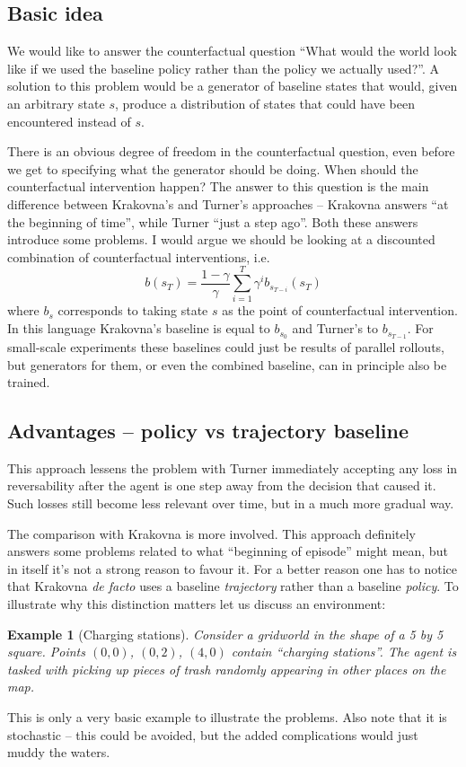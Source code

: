 \documentclass{article}
\newcommand{\baseline}{b}
\newtheorem{example}{Example}
\begin{document}
	\subsection{Basic idea}
	 We would like to answer the counterfactual question ``What would the world look like if we used
		the baseline policy rather than the policy we actually used?''.
	 A solution to this problem would be a generator of baseline states that would,
		given an arbitrary state $s$, produce a distribution of states that could have
		been encountered instead of $s$.

		There is an obvious degree of freedom in the counterfactual question,
		even before we get to specifying what the generator should be doing.
		When should the counterfactual intervention happen? The answer to this
		question is the main difference between Krakovna's and Turner's approaches
		-- Krakovna answers ``at the beginning of time'', while Turner ``just a step ago''.
		Both these answers introduce some problems. I would argue we should be looking at
		a discounted combination of counterfactual interventions, i.e.
		\begin{equation}
			\baseline\left( s_T \right) = \frac{1-\gamma}{\gamma} \sum_{i=1}^T \gamma^{i} \baseline_{s_{T-i}}\left( s_T \right)
			\label{eq:discountedBaseline}
		\end{equation}
		where $\baseline_s$ corresponds to taking state $s$ as the point of counterfactual intervention.
		In this language Krakovna's baseline is equal to $\baseline_{s_0}$ and Turner's to $\baseline_{s_{T-1}}$.
		For small-scale experiments these baselines could just be results of parallel rollouts,
		but generators for them, or even the combined baseline, can in principle also be trained.
	\subsection{Advantages -- policy vs trajectory baseline}
	 This approach lessens the problem with Turner immediately accepting any loss in reversability
		after the agent is one step away from the decision that caused it. Such losses still
		become less relevant over time, but in a much more gradual way.

		The comparison with Krakovna is more involved. This approach definitely answers some problems
		related to what ``beginning of episode'' might mean, but in itself it's not a strong reason to
		favour it. For a better reason one has to notice that Krakovna \emph{de facto} uses a baseline
		\emph{trajectory} rather than a baseline \emph{policy}. To illustrate why this distinction
		matters let us discuss an environment:
		\begin{example}[Charging stations]
			Consider a gridworld in the shape of a 5 by 5 square. Points $\left( 0,0 \right)$,
			$\left( 0,2 \right)$, $\left( 4,0 \right)$ contain ``charging stations''. The agent is tasked
			with picking up pieces of trash randomly appearing in other places on the map.
		\end{example}
		This is only a very basic example to illustrate the problems. Also note that it is stochastic --
		this could be avoided, but the added complications would just muddy the waters.
\end{document}
